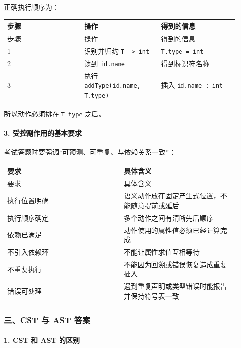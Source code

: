 \documentclass[UTF8]{ctexart}
\begin{document}
正确执行顺序为：

\begin{longtable}{|p{0.31\linewidth}|p{0.31\linewidth}|p{0.31\linewidth}|}
\hline
步骤 & 操作 & 得到的信息 \\
\hline
\endfirsthead
步骤 & 操作 & 得到的信息 \\
\hline
\endhead
1 & 识别并归约 \texttt{T -> int} & \texttt{T.type = int} \\
\hline
2 & 读到 \texttt{id.name} & 得到标识符名称 \\
\hline
3 & 执行 \texttt{addType(id.name, T.type)} & 插入 \texttt{id.name : int} \\
\hline
\end{longtable}

所以动作必须排在 \texttt{T.type} 之后。

\paragraph*{3. 受控副作用的基本要求}

考试答题时要强调“可预测、可重复、与依赖关系一致”：

\begin{longtable}{|p{0.47\linewidth}|p{0.47\linewidth}|}
\hline
要求 & 具体含义 \\
\hline
\endfirsthead
要求 & 具体含义 \\
\hline
\endhead
执行位置明确 & 语义动作放在固定产生式位置，不能随意提前或延后 \\
\hline
执行顺序确定 & 多个动作之间有清晰先后顺序 \\
\hline
依赖已满足 & 动作使用的属性值必须已经计算完成 \\
\hline
不引入依赖环 & 不能让属性求值互相等待 \\
\hline
不重复执行 & 不能因为回溯或错误恢复造成重复插入 \\
\hline
错误可处理 & 遇到重复声明或类型错误时能报告并保持符号表一致 \\
\hline
\end{longtable}

\subsubsection*{三、CST 与 AST 答案}

\paragraph*{1. CST 和 AST 的区别}
\end{document}
